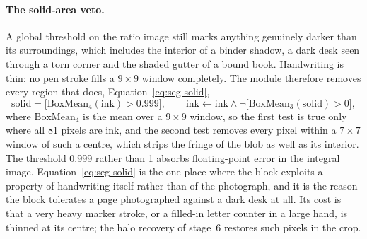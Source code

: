 \paragraph{The solid-area veto.}
A global threshold on the ratio image still marks anything genuinely darker than its surroundings, which includes the interior of a binder shadow, a dark desk seen through a torn corner and the shaded gutter of a bound book.
Handwriting is thin: no pen stroke fills a $9\times9$ window completely.
The module therefore removes every region that does, Equation~\ref{eq:seg-solid},
\begin{equation}
\mathrm{solid}=\bigl[\mathrm{BoxMean}_4(\mathrm{ink})>0.999\bigr],\qquad
\mathrm{ink}\leftarrow\mathrm{ink}\wedge\neg\bigl[\mathrm{BoxMean}_3(\mathrm{solid})>0\bigr],
\label{eq:seg-solid}
\end{equation}
where $\mathrm{BoxMean}_4$ is the mean over a $9\times9$ window, so the first test is true only where all 81 pixels are ink, and the second test removes every pixel within a $7\times7$ window of such a centre, which strips the fringe of the blob as well as its interior.
The threshold 0.999 rather than 1 absorbs floating-point error in the integral image.
Equation~\ref{eq:seg-solid} is the one place where the block exploits a property of handwriting itself rather than of the photograph, and it is the reason the block tolerates a page photographed against a dark desk at all.
Its cost is that a very heavy marker stroke, or a filled-in letter counter in a large hand, is thinned at its centre; the halo recovery of stage~6 restores such pixels in the crop.

